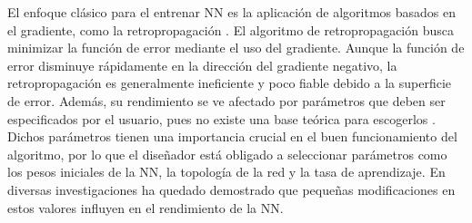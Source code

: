 

El enfoque clásico para el entrenar NN es la aplicación de algoritmos basados en el gradiente, como la retropropagación \cite{Rumelhart1986b}. El algoritmo de retropropagación busca minimizar la función de error mediante el uso del gradiente. Aunque la función de error disminuye rápidamente en la dirección del gradiente negativo, la retropropagación es generalmente ineficiente y poco fiable \cite{Gori1992} debido a la superficie de error. Además, su rendimiento se ve afectado por parámetros que deben ser especificados por el usuario, pues no existe una base teórica para escogerlos \cite{Nguyen1990}. Dichos parámetros tienen una importancia crucial en el buen funcionamiento del algoritmo, por lo que el diseñador está obligado a seleccionar parámetros como los pesos iniciales de la NN, la topología de la red y la tasa de aprendizaje. En diversas investigaciones \cite{Cauchy1847, Grippo1994, Plagianakos1998, Plagianakos2002} ha quedado demostrado que pequeñas modificaciones en estos valores influyen en el rendimiento de la NN.

